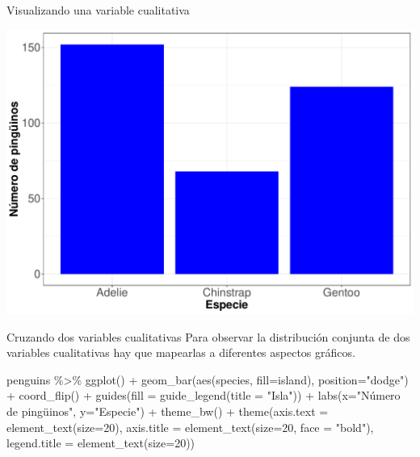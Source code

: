 \documentclass[
  ignorenonframetext,
  aspectratio=169]{beamer}
\newenvironment{Shaded}{\begin{snugshade}}{\end{snugshade}}
\newcommand{\AttributeTok}[1]{\textcolor[rgb]{0.77,0.63,0.00}{#1}}
\newcommand{\DecValTok}[1]{\textcolor[rgb]{0.00,0.00,0.81}{#1}}
\newcommand{\FunctionTok}[1]{\textcolor[rgb]{0.00,0.00,0.00}{#1}}
\newcommand{\NormalTok}[1]{#1}
\newcommand{\SpecialCharTok}[1]{\textcolor[rgb]{0.00,0.00,0.00}{#1}}
\newcommand{\StringTok}[1]{\textcolor[rgb]{0.31,0.60,0.02}{#1}}
\begin{document}
\begin{frame}{Visualizando una variable cualitativa}
\protect\hypertarget{visualizando-una-variable-cualitativa}{}
\begin{center}\includegraphics[width=0.6\linewidth,height=0.6\textheight]{tidyverse_AD_files/figure-beamer/unnamed-chunk-128-1} \end{center}
\end{frame}

\begin{frame}[fragile]{Cruzando dos variables cualitativas}
\protect\hypertarget{cruzando-dos-variables-cualitativas}{}
Para observar la distribución conjunta de dos variables cualitativas hay
que mapearlas a diferentes aspectos gráficos.

\begin{Shaded}
\begin{Highlighting}[]
\NormalTok{penguins }\SpecialCharTok{\%\textgreater{}\%} \FunctionTok{ggplot}\NormalTok{() }\SpecialCharTok{+} 
  \FunctionTok{geom\_bar}\NormalTok{(}\FunctionTok{aes}\NormalTok{(species, }\AttributeTok{fill=}\NormalTok{island),}
           \AttributeTok{position=}\StringTok{"dodge"}\NormalTok{) }\SpecialCharTok{+} \FunctionTok{coord\_flip}\NormalTok{() }\SpecialCharTok{+}
  \FunctionTok{guides}\NormalTok{(}\AttributeTok{fill =} \FunctionTok{guide\_legend}\NormalTok{(}\AttributeTok{title =} \StringTok{"Isla"}\NormalTok{)) }\SpecialCharTok{+}
  \FunctionTok{labs}\NormalTok{(}\AttributeTok{x=}\StringTok{"Número de pingüinos"}\NormalTok{, }\AttributeTok{y=}\StringTok{"Especie"}\NormalTok{) }\SpecialCharTok{+}
  \FunctionTok{theme\_bw}\NormalTok{() }\SpecialCharTok{+}
  \FunctionTok{theme}\NormalTok{(}\AttributeTok{axis.text =} \FunctionTok{element\_text}\NormalTok{(}\AttributeTok{size=}\DecValTok{20}\NormalTok{),}
        \AttributeTok{axis.title =} \FunctionTok{element\_text}\NormalTok{(}\AttributeTok{size=}\DecValTok{20}\NormalTok{, }\AttributeTok{face =} \StringTok{"bold"}\NormalTok{),}
        \AttributeTok{legend.title =} \FunctionTok{element\_text}\NormalTok{(}\AttributeTok{size=}\DecValTok{20}\NormalTok{)) }
\end{Highlighting}
\end{Shaded}
\end{frame}
\end{document}
